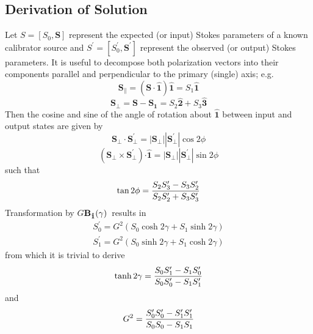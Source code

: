 \documentclass[12pt]{article}
\newcommand{\boost}[1][1]{{\ensuremath{ {\bf B}_{\bm{\hat {#1}}}(\gamma) }}}
\begin{document}
\subsection*{Derivation of Solution}

Let $S=[S_0,\bm{S}]$ represent the expected (or input) Stokes
parameters of a known calibrator source and
$S^\prime=[S_0^\prime,\bm{S}^\prime]$ represent the observed (or
output) Stokes parameters.  It is useful to decompose both
polarization vectors into their components parallel and perpendicular
to the primary (single) axis; e.g.
\[
\bm{S_\parallel} = (\bm{S \cdot \hat 1}) \bm{\hat 1} = S_1\bm{\hat 1}
\]
\[
\bm{S_\perp} = \bm{S} - \bm{S_1} = S_2\bm{\hat 2} + S_3\bm{\hat 3}
\]
%
Then the cosine and sine of the angle of rotation about $\bm{\hat 1}$ between input and output
states are given by
%
\[
\bm{S_\perp \cdot S_\perp^\prime} = |\bm{S_\perp}| |\bm{S_\perp^\prime}| \cos2\phi
\]
\[
(\bm{S_\perp \times S_\perp^\prime}) \bm{\cdot \hat 1} = |\bm{S_\perp}| |\bm{S_\perp^\prime}| \sin2\phi
\]
such that
\begin{equation}
\tan2\phi = { {S_2 S_3^\prime - S_3 S_2^\prime} \over S_2 S_2^\prime + S_3 S_3^\prime  }
\end{equation}
Transformation by $G$\boost\ results in
\begin{eqnarray*}
S_0^\prime = G^2 \left( S_0 \cosh2\gamma + S_1 \sinh2\gamma \right) \\
S_1^\prime = G^2 \left( S_0 \sinh2\gamma + S_1 \cosh2\gamma \right)
\end{eqnarray*}
from which it is trivial to derive
\begin{equation}
\tanh2\gamma = { {S_0 S_1^\prime - S_1 S_0^\prime} \over S_0 S_0^\prime - S_1 S_1^\prime  }
\end{equation}
and
\begin{equation}
G^2 = { {S_0^\prime S_0^\prime - S_1^\prime S_1^\prime} \over S_0 S_0 - S_1 S_1 }
\end{equation}
\end{document}
